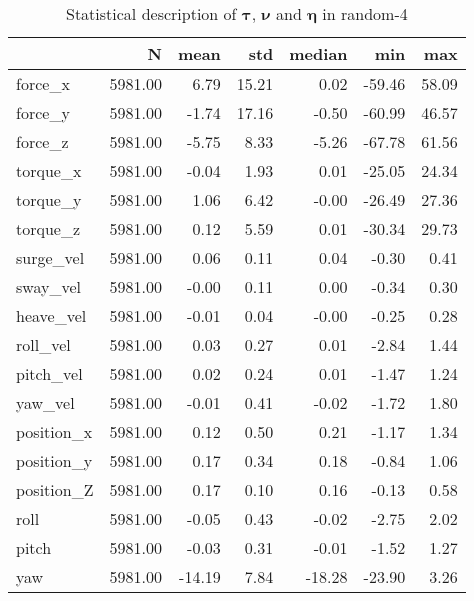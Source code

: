 \begin{table}[hb]
\centering
\caption{Statistical description of $\boldsymbol{\tau}$, $\boldsymbol{\nu}$ and $\boldsymbol{\eta}$ in random-4}
\label{tab:description-random-4}
\begin{tabular}{lrrrrrr}
\toprule
{} &       N &   mean &   std & median &    min &   max \\
\midrule
force\_x    & 5981.00 &   6.79 & 15.21 &   0.02 & -59.46 & 58.09 \\
force\_y    & 5981.00 &  -1.74 & 17.16 &  -0.50 & -60.99 & 46.57 \\
force\_z    & 5981.00 &  -5.75 &  8.33 &  -5.26 & -67.78 & 61.56 \\
torque\_x   & 5981.00 &  -0.04 &  1.93 &   0.01 & -25.05 & 24.34 \\
torque\_y   & 5981.00 &   1.06 &  6.42 &  -0.00 & -26.49 & 27.36 \\
torque\_z   & 5981.00 &   0.12 &  5.59 &   0.01 & -30.34 & 29.73 \\
surge\_vel  & 5981.00 &   0.06 &  0.11 &   0.04 &  -0.30 &  0.41 \\
sway\_vel   & 5981.00 &  -0.00 &  0.11 &   0.00 &  -0.34 &  0.30 \\
heave\_vel  & 5981.00 &  -0.01 &  0.04 &  -0.00 &  -0.25 &  0.28 \\
roll\_vel   & 5981.00 &   0.03 &  0.27 &   0.01 &  -2.84 &  1.44 \\
pitch\_vel  & 5981.00 &   0.02 &  0.24 &   0.01 &  -1.47 &  1.24 \\
yaw\_vel    & 5981.00 &  -0.01 &  0.41 &  -0.02 &  -1.72 &  1.80 \\
position\_x & 5981.00 &   0.12 &  0.50 &   0.21 &  -1.17 &  1.34 \\
position\_y & 5981.00 &   0.17 &  0.34 &   0.18 &  -0.84 &  1.06 \\
position\_Z & 5981.00 &   0.17 &  0.10 &   0.16 &  -0.13 &  0.58 \\
roll       & 5981.00 &  -0.05 &  0.43 &  -0.02 &  -2.75 &  2.02 \\
pitch      & 5981.00 &  -0.03 &  0.31 &  -0.01 &  -1.52 &  1.27 \\
yaw        & 5981.00 & -14.19 &  7.84 & -18.28 & -23.90 &  3.26 \\
\bottomrule
\end{tabular}
\end{table}
